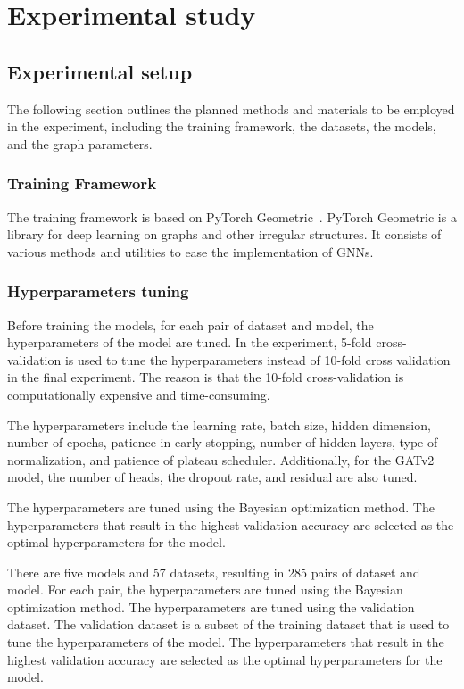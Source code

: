 \documentclass{article}
\begin{document}
\section{Experimental study}

\subsection{Experimental setup}
The following section outlines the planned methods and materials to be employed in the experiment, including the training framework, the datasets, the models, and the graph parameters.

\subsubsection{Training Framework}
The training framework is based on PyTorch Geometric~\cite{fey2019fast}. PyTorch Geometric is a library for deep learning on graphs and other irregular structures. It consists of various methods and utilities to ease the implementation of GNNs. 

\subsubsection{Hyperparameters tuning}
Before training the models, for each pair of dataset and model, the hyperparameters of the model are tuned. In the experiment, 5-fold cross-validation is used to tune the hyperparameters instead of 10-fold cross validation in the final experiment. The reason is that the 10-fold cross-validation is computationally expensive and time-consuming. 

The hyperparameters include the learning rate, batch size, hidden dimension, number of epochs, patience in early stopping, number of hidden layers, type of normalization, and patience of plateau scheduler. Additionally, for the GATv2 model, the number of heads, the dropout rate, and residual are also tuned.

The hyperparameters are tuned using the Bayesian optimization method\cite{frazier2018tutorial}. The hyperparameters that result in the highest validation accuracy are selected as the optimal hyperparameters for the model. 

There are five models and 57 datasets, resulting in 285 pairs of dataset and model. For each pair, the hyperparameters are tuned using the Bayesian optimization method. The hyperparameters are tuned using the validation dataset. The validation dataset is a subset of the training dataset that is used to tune the hyperparameters of the model. The hyperparameters that result in the highest validation accuracy are selected as the optimal hyperparameters for the model.
\end{document}
